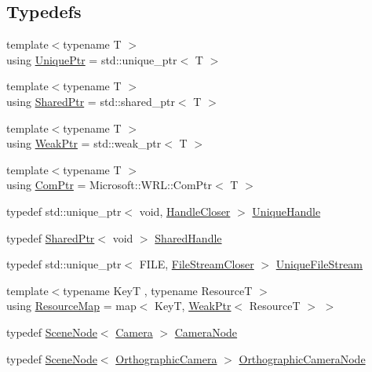 \subsection*{Typedefs}
\begin{DoxyCompactItemize}
\item 
{\footnotesize template$<$typename T $>$ }\\using \hyperlink{namespacemage_a8c307fbcc33bce9b7f2aa4c26c3b95cf}{Unique\+Ptr} = std\+::unique\+\_\+ptr$<$ T $>$
\item 
{\footnotesize template$<$typename T $>$ }\\using \hyperlink{namespacemage_a1e01ae66713838a7a67d30e44c67703e}{Shared\+Ptr} = std\+::shared\+\_\+ptr$<$ T $>$
\item 
{\footnotesize template$<$typename T $>$ }\\using \hyperlink{namespacemage_aa159a63c0d58464bdf32dfe419dd5dc1}{Weak\+Ptr} = std\+::weak\+\_\+ptr$<$ T $>$
\item 
{\footnotesize template$<$typename T $>$ }\\using \hyperlink{namespacemage_ae74f374780900893caa5555d1031fd79}{Com\+Ptr} = Microsoft\+::\+W\+R\+L\+::\+Com\+Ptr$<$ T $>$
\item 
typedef std\+::unique\+\_\+ptr$<$ void, \hyperlink{structmage_1_1_handle_closer}{Handle\+Closer} $>$ \hyperlink{namespacemage_a284e84e551a05d4fc6c957985b2de3ed}{Unique\+Handle}
\item 
typedef \hyperlink{namespacemage_a1e01ae66713838a7a67d30e44c67703e}{Shared\+Ptr}$<$ void $>$ \hyperlink{namespacemage_ab892828913d6129acf71e0cec60467e5}{Shared\+Handle}
\item 
typedef std\+::unique\+\_\+ptr$<$ F\+I\+LE, \hyperlink{structmage_1_1_file_stream_closer}{File\+Stream\+Closer} $>$ \hyperlink{namespacemage_a679c1b707dee02c7eab8d706ef14411a}{Unique\+File\+Stream}
\item 
{\footnotesize template$<$typename KeyT , typename ResourceT $>$ }\\using \hyperlink{namespacemage_a0b0a087ad59dd4aa0b4b538d8caec216}{Resource\+Map} = map$<$ KeyT, \hyperlink{namespacemage_aa159a63c0d58464bdf32dfe419dd5dc1}{Weak\+Ptr}$<$ ResourceT $>$ $>$
\item 
typedef \hyperlink{classmage_1_1_scene_node}{Scene\+Node}$<$ \hyperlink{classmage_1_1_camera}{Camera} $>$ \hyperlink{namespacemage_a66d89b8744111e4827547a8996fc8ad8}{Camera\+Node}
\item 
typedef \hyperlink{classmage_1_1_scene_node}{Scene\+Node}$<$ \hyperlink{classmage_1_1_orthographic_camera}{Orthographic\+Camera} $>$ \hyperlink{namespacemage_ab4bde438cc5dd644b0092500df32a83e}{Orthographic\+Camera\+Node}

\end{DoxyCompactItemize}
